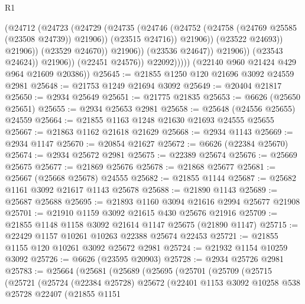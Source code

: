 \begin{lexlean}{R1}
\begin{coremodule}
                                      (@24712
                                        (@24723
                                          (@24729
                                            (@24735
                                              (@24746
                                                (@24752
                                                  (@24758 (@24769 @25585 (@23508 @24739)) @21906))
                                                (@23515 @24716))
                                              @21906))
                                          (@23522 @24693))
                                        @21906))
                                    (@23529 @24670))
                                  @21906))
                              (@23536 @24647))
                            @21906))
                        (@23543 @24624))
                      @21906))
                  (@22451 @24576))
                @22092)))))
      (@22140 @960 @21424 @429 @964 @21609 @20386))
@25645 := @21855 @1250 @120 @21696 @3092 @24559 @2981
@25648 := @21753 @1249 @21694 @3092
@25649 := @20404 @21817
@25650 := @2934 @25649
@25651 := @21775 @21835
@25653 := @6626 (@25650 @25651)
@25655 := @2934 @25653 @2981
@25658 := @25648 (@24556 @25655) @24559
@25664 := @21855 @1163 @1248 @21630 @21693 @24555 @25655
@25667 := @21863 @1162 @21618 @21629
@25668 := @2934 @1143
@25669 := @2934 @1147
@25670 := @20854 @21627
@25672 := @6626 (@22384 @25670)
@25674 := @2934 @25672 @2981
@25675 := @22389 @25674
@25676 := @25669 @25675
@25677 := @21869 @25676
@25678 := @21868 @25677
@25681 := @25667 (@25668 @25678) @24555
@25682 := @21855 @1144
@25687 := @25682 @1161 @3092 @21617 @1143 @25678
@25688 := @21890 @1143
@25689 := @25687 @25688
@25695 := @21893 @1160 @3094 @21616 @2994 @25677 @21908
@25701 := @21910 @1159 @3092 @21615 @430 @25676 @21916
@25709 := @21855 @1148 @1158 @3092 @21614 @1147 @25675 (@21890 @1147)
@25715 := @22429 @1157 @10261 @10263 @22388 @25674 @22453
@25721 := @21855 @1155 @120 @10261 @3092 @25672 @2981
@25724 := @21932 @1154 @10259 @3092
@25726 := @6626 (@23595 @20903)
@25728 := @2934 @25726 @2981
@25783 := @25664
    (@25681
      (@25689
        (@25695
          (@25701
            (@25709
              (@25715
                (@25721
                  (@25724
                    (@22384 @25728)
                    @25672
                    (@22401
                      @1153
                      @3092
                      @10258
                      @538
                      @25728
                      @22407
                      (@21855
                        @1151

\end{coremodule}
\end{lexlean}
